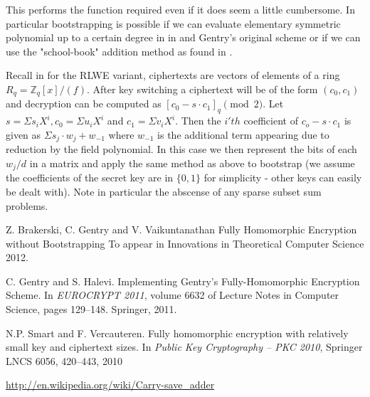 \documentclass[11pt]{article}
\newcommand{\Z}{{\mathbb Z}}
\begin{document}
This performs the function required even if it does seem a little cumbersome.  In particular bootstrapping is possible if we can evaluate elementary symmetric polynomial up to a certain degree in in \cite{SV10} and Gentry's original scheme or if we can use the "school-book" addition method as found in \cite{GH10}.

Recall in \cite{BGV11} for the RLWE variant, ciphertexts are vectors of elements of a ring $R_q = \Z_q[x] / (f) $.  After key switching a ciphertext will be of the form $(c_0,c_1)$ and decryption can be computed as $[c_0 - s\cdot c_1]_q \pmod{2}$.  Let $s = \Sigma s_i X^i, c_0 = \Sigma u_i X^i$ and $c_1 = \Sigma v_i X^i$. Then the $i'th$ coefficient of $c_o - s \cdot c_1$ is given as $\Sigma s_j \cdot w_j + w_{-1}$ where $w_{-1}$ is the additional term appearing due to reduction by the field polynomial.  In this case we then represent the bits of each $w_j / d$ in a matrix and apply the same method as above to bootstrap (we assume the coefficients of the secret key are in $\{0,1 \}$ for simplicity - other keys can easily be dealt with).  Note in particular the abscense of any sparse subset sum problems.

\begin{thebibliography}{xx}

Z. Brakerski, C. Gentry and V. Vaikuntanathan
\newblock Fully Homomorphic Encryption without Bootstrapping
\newblock To appear in Innovations in Theoretical Computer Science 2012.


C. Gentry and S. Halevi.
\newblock Implementing Gentry’s Fully-Homomorphic Encryption Scheme. 
\newblock In {\em EUROCRYPT 2011}, volume 6632 of
Lecture Notes in Computer Science, pages 129–148. Springer, 2011.


N.P. Smart and F. Vercauteren.
\newblock Fully homomorphic encryption with relatively small key and ciphertext sizes. 
\newblock In {\em Public Key Cryptography -- PKC 2010}, 
Springer LNCS 6056, 420--443, 2010

\url{http://en.wikipedia.org/wiki/Carry-save_adder}

\end{thebibliography}





\end{document}
